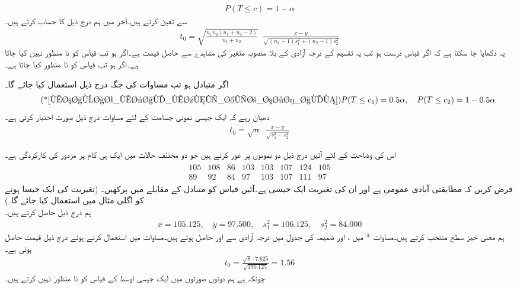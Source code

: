 \begin{align}\label{مساوات_مثال_معنی_خیز_سطح_الف}
P(T\le c)=1-\alpha
\end{align}
سے تعین کرتے ہیں۔آخر میں ہم درج ذیل کا حساب کرتے ہیں۔
\begin{align}\label{مساوات_مثال_معنی_خیز_سطح_ب}
t_0=\sqrt{\frac{n_1n_2(n_1+n_2-2)}{n_1+n_2}}\,\,\, \frac{\overline{x}-\overline{y}}{\sqrt{(n_1-1)s_1^2+(n_2-1)s_2^2}}
\end{align}
یہ دکھایا جا سکتا ہے کہ اگر قیاس درست ہو تب یہ   تقسیم کے   درجہ آزادی کے  بلا منصوبہ متغیر کی مشاہدے سے حاصل قیمت ہے۔اگر  ہو تب قیاس کو نا منظور نہیں کیا جاتا ہے۔اگر ہو تب قیاس کو نا منظور کیا جاتا ہے۔

اگر متبادل  ہو تب مساوات  کی جگہ درج ذیل استعمال کیا جائے گا۔
\begin{align*}\tag*{(*\ref{مساوات_مثال_معنی_خیز_سطح_الف})}
P(T\le c_1)=0.5\alpha,\quad P(T\le c_2)=1-0.5\alpha
\end{align*}
دھیان رہے کہ ایک جیسی نمونی جسامت  کے لئے  مساوات  درج ذیل صورت اختیار کرتی ہے۔
\begin{align}\label{مساوات_مثال_معنی_خیز_سطح_پ}
t_0=\sqrt{n}\,\,\,\frac{\overline{x}-\overline{y}}{\sqrt{s_1^2-s_2^2}}
\end{align}

اس کی وضاحت کے لئے آئیں درج ذیل دو نمونوں پر غور کرتے ہیں جو دو مختلف حالات  میں ایک ہی کام پر مزدور کی کارکردگی ہے۔
\begin{align*}
\begin{array}{rrrrrrrr}
105&108&86&103&103&107&124&105\\
89&92&84&97&103&107&111&97
\end{array}
\end{align*}
فرض کریں کہ مطابقتی آبادی عمومی ہے اور ان کی تغیریت ایک جیسی ہے۔آئیں قیاس  کو متبادل  کے مقابلے میں پرکھیں۔ (تغیریت کی ایک جیسا ہونے کو اگلی مثال میں استعمال کیا جائے گا۔)\\
\quad
ہم درج ذیل حاصل کرتے ہیں۔
\begin{align*}
\overline{x}=105.125,\quad \overline{y}=97.500,\quad s_1^2=106.125,\quad s_2^2=84.000
\end{align*}
ہم معنی خیز سطح  منتخب کرتے ہیں۔مساوات * میں ،  اور  ضمیمہ  کی جدول  میں  درجہ آزادی سے  اور  حاصل ہوتے ہیں۔مساوات  میں  استعمال کرتے ہوئے درج ذیل قیمت حاصل ہوتی ہے۔
\begin{align*}
t_0=\frac{\sqrt{8}\cdot 7.625}{\sqrt{190.125}}=1.56
\end{align*}
چونکہ  ہے ہم دونوں صورتوں میں ایک جیسی اوسط کے  قیاس  کو نا منظور نہیں کرتے ہیں۔

